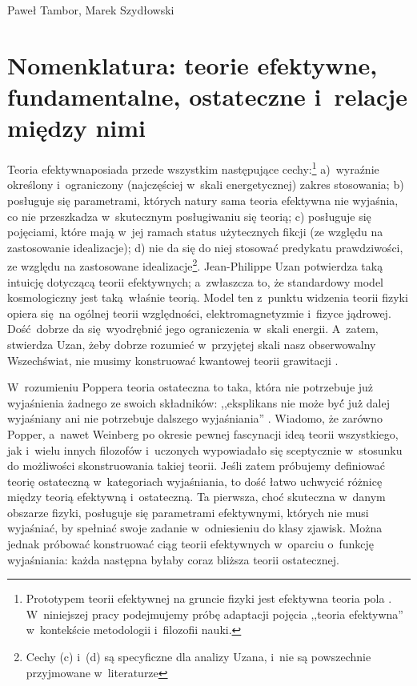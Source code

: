 \begin{artplenv}{Paweł Tambor, Marek Szydłowski}
\section{Nomenklatura: teorie efektywne, fundamentalne, ostateczne i~relacje między nimi}
Teoria efektywnaposiada przede wszystkim następujące cechy:\footnote{Prototypem teorii efektywnej na gruncie fizyki jest efektywna teoria pola
\parencites[][]{kim_wilson_1998}[][]{wilson_renormalization_1971}. %
 W~niniejszej pracy podejmujemy próbę adaptacji pojęcia ,,teoria efektywna'' w~kontekście metodologii i~filozofii nauki.}
 a)~wyraźnie określony i~ograniczony (najczęściej w~skali energetycznej) zakres stosowania; b) posługuje się parametrami, których natury sama teoria efektywna nie wyjaśnia, co nie przeszkadza w~skutecznym posługiwaniu się teorią; c) posługuje się pojęciami, które mają w~jej ramach status użytecznych fikcji (ze względu na zastosowanie idealizacje); d) nie da się do niej stosować predykatu prawdziwości, ze względu na zastosowane idealizacje\footnote{Cechy (c) i~(d) są specyficzne dla analizy Uzana, i~nie są powszechnie przyjmowane w~literaturze}. Jean-Philippe Uzan potwierdza taką intuicję dotyczącą teorii efektywnych; a~zwłaszcza to, że standardowy model kosmologiczny jest taką~właśnie teorią. Model ten z~punktu widzenia teorii fizyki opiera się~na ogólnej teorii względności, elektromagnetyzmie i~fizyce jądrowej. Dość~dobrze da się~wyodrębnić jego ograniczenia w~skali energii. A~zatem, stwierdza Uzan, żeby dobrze rozumieć w~przyjętej skali nasz obserwowalny Wszechświat, nie musimy konstruować kwantowej teorii grawitacji 
\parencite[][s.~109]{uzan_emergent_2017}.%


W~rozumieniu Poppera teoria ostateczna to taka, która nie potrzebuje już wyjaśnienia żadnego ze swoich składników: ,,eksplikans nie może by\'{ć} ju\.{ż} dalej wyjaśniany ani nie potrzebuje dalszego wyjaśniania''
\parencite[][s.~159]{popper_wiedza_2002}. %
 Wiadomo, że zarówno Popper, a~nawet Weinberg po okresie pewnej fascynacji ideą teorii wszystkiego, jak i~wielu innych filozofów i~uczonych wypowiadało się sceptycznie w~stosunku do możliwości skonstruowania takiej teorii. Jeśli zatem próbujemy definiować teorię ostateczną w~kategoriach wyjaśniania, to dość łatwo uchwycić różnicę między teorią efektywną i~ostateczną. Ta pierwsza, choć skuteczna w~danym obszarze fizyki, posługuje się parametrami efektywnymi, których nie musi wyjaśniać, by spełniać swoje zadanie w~odniesieniu do klasy zjawisk. Można jednak próbować konstruować ciąg teorii efektywnych w~oparciu o~funkcję wyjaśniania: każda następna byłaby coraz bliższa teorii ostatecznej.


\end{artplenv}

